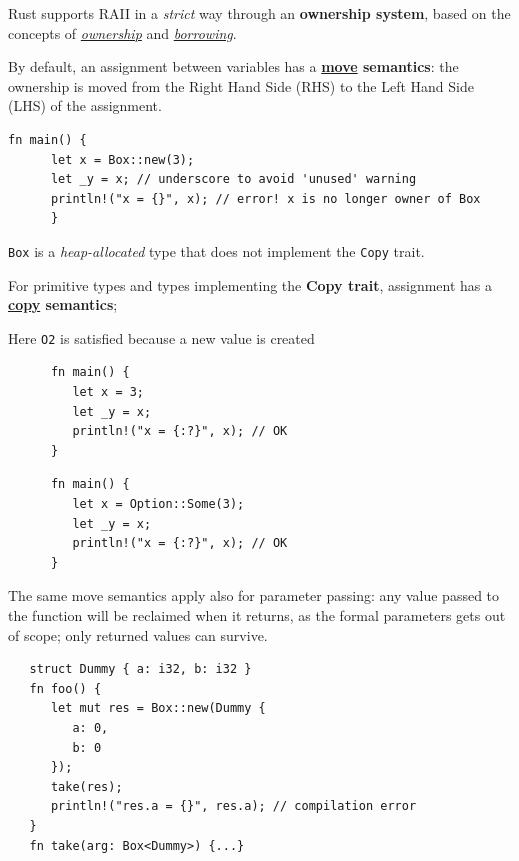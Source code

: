 Rust supports RAII in a \textit{strict} way through an \textbf{ownership system}, based on the concepts of \textit{\underline{ownership}} and \textit{\underline{borrowing}}.

By default, an assignment between variables has
a \textbf{\underline{move} semantics}:
the ownership is moved from the Right Hand Side (RHS) to the Left Hand Side (LHS) of the assignment.  
\begin{lstlisting}[caption={\texttt{O2} violated}]
   fn main() {
      let x = Box::new(3);
      let _y = x; // underscore to avoid 'unused' warning
      println!("x = {}", x); // error! x is no longer owner of Box
      }
\end{lstlisting}
\lstinline|Box| is a \textit{heap-allocated} type that does not implement the \lstinline|Copy| trait.

For primitive types and types implementing the \textbf{Copy
trait}, assignment has a \textbf{\underline{copy} semantics};
\begin{center}
   Here \texttt{O2} is satisfied because a new value is created
\end{center}
\begin{paracol}{2}
   \begin{lstlisting}
      fn main() {
         let x = 3;
         let _y = x;
         println!("x = {:?}", x); // OK
      }
   \end{lstlisting}
   
   \switchcolumn

   \begin{lstlisting}
      fn main() {
         let x = Option::Some(3);
         let _y = x;
         println!("x = {:?}", x); // OK
      }
   \end{lstlisting}
\end{paracol}

The same move semantics apply also for parameter passing:
any value passed to the function will be reclaimed
when it returns, as the formal parameters gets out of
scope;
only returned values can survive.
\begin{lstlisting}
   struct Dummy { a: i32, b: i32 }
   fn foo() {
      let mut res = Box::new(Dummy {
         a: 0,
         b: 0
      });
      take(res);
      println!("res.a = {}", res.a); // compilation error
   }
   fn take(arg: Box<Dummy>) {...}
\end{lstlisting}

